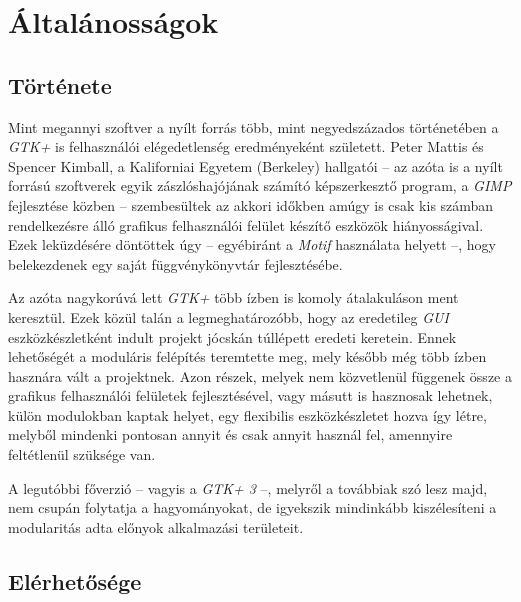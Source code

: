 \section{Általánosságok}

\subsection{Története}

Mint megannyi szoftver a nyílt forrás több, mint negyedszázados történetében a \textit{GTK+} is felhasználói elégedetlenség eredményeként született. Peter Mattis és Spencer Kimball, a Kaliforniai Egyetem (Berkeley) hallgatói -- az azóta is a nyílt forrású szoftverek egyik zászlóshajójának számító képszerkesztő program, a \textit{GIMP} fejlesztése közben -- szembesültek az akkori időkben amúgy is csak kis számban rendelkezésre álló grafikus felhasználói felület készítő eszközök hiányosságival. Ezek leküzdésére döntöttek úgy -- egyébiránt a \textit{Motif} használata helyett --, hogy belekezdenek egy saját függvénykönyvtár fejlesztésébe.

Az azóta nagykorúvá lett \textit{GTK+} több ízben is komoly átalakuláson ment keresztül. Ezek közül talán a legmeghatározóbb, hogy az eredetileg \textit{GUI} eszközkészletként indult projekt jócskán túllépett eredeti keretein. Ennek lehetőségét a moduláris felépítés teremtette meg, mely később még több ízben hasznára vált a projektnek. Azon részek, melyek nem közvetlenül függenek össze a grafikus felhasználói felületek fejlesztésével, vagy másutt is hasznosak lehetnek, külön modulokban kaptak helyet, egy flexibilis eszközkészletet hozva így létre, melyből mindenki pontosan annyit és csak annyit használ fel, amennyire feltétlenül szüksége van.

A legutóbbi főverzió -- vagyis a \textit{GTK+ 3} --, melyről a továbbiak szó lesz majd, nem csupán folytatja a hagyományokat, de igyekszik mindinkább kiszélesíteni a modularitás adta előnyok alkalmazási területeit.

\subsection{Elérhetősége}


